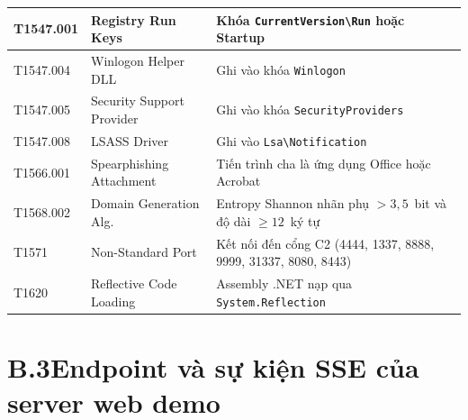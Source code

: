 \documentclass[../DoAn.tex]{subfiles}
\begin{document}
\begin{table}[H]
\begin{tabular}{|l|l|>{\raggedright\arraybackslash}p{5.8cm}|}
\hline
T1547.001   & Registry Run Keys           & Khóa \texttt{CurrentVersion\textbackslash{}Run} hoặc Startup \\
\hline
T1547.004   & Winlogon Helper DLL         & Ghi vào khóa \texttt{Winlogon} \\
\hline
T1547.005   & Security Support Provider   & Ghi vào khóa \texttt{SecurityProviders} \\
\hline
T1547.008   & LSASS Driver                & Ghi vào \texttt{Lsa\textbackslash{}Notification} \\
\hline
T1566.001   & Spearphishing Attachment    & Tiến trình cha là ứng dụng Office hoặc Acrobat \\
\hline
T1568.002   & Domain Generation Alg.      & Entropy Shannon nhãn phụ $>3{,}5$~bit và độ dài $\geq 12$~ký tự \\
\hline
T1571       & Non-Standard Port           & Kết nối đến cổng C2 (4444, 1337, 8888, 9999, 31337, 8080, 8443) \\
\hline
T1620       & Reflective Code Loading     & Assembly .NET nạp qua \texttt{System.Reflection} \\
\hline
\end{tabular}
\end{table}
\section*{B.3\quad Endpoint và sự kiện SSE của server web demo}
\end{document}
